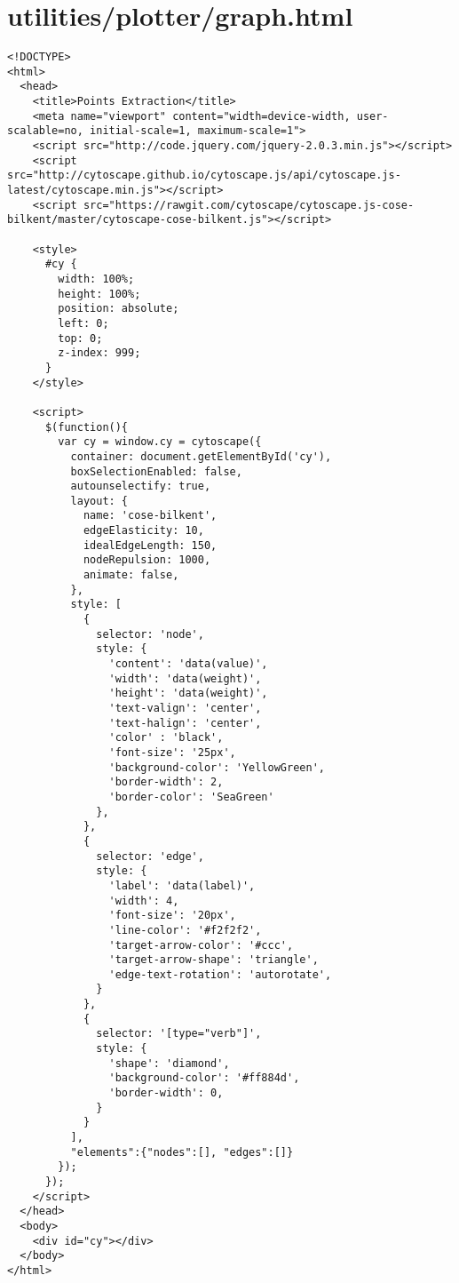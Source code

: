\documentclass{article}
\begin{document}
\section*{utilities/plotter/graph.html}
\begin{verbatim}
<!DOCTYPE>
<html>
  <head>
    <title>Points Extraction</title>
    <meta name="viewport" content="width=device-width, user-scalable=no, initial-scale=1, maximum-scale=1">
    <script src="http://code.jquery.com/jquery-2.0.3.min.js"></script>
    <script src="http://cytoscape.github.io/cytoscape.js/api/cytoscape.js-latest/cytoscape.min.js"></script>
    <script src="https://rawgit.com/cytoscape/cytoscape.js-cose-bilkent/master/cytoscape-cose-bilkent.js"></script>

    <style>
      #cy {
        width: 100%;
        height: 100%;
        position: absolute;
        left: 0;
        top: 0;
        z-index: 999;
      }
    </style>

    <script>
      $(function(){
        var cy = window.cy = cytoscape({
          container: document.getElementById('cy'),
          boxSelectionEnabled: false,
          autounselectify: true,
          layout: {
            name: 'cose-bilkent',
            edgeElasticity: 10,
            idealEdgeLength: 150,
            nodeRepulsion: 1000,
            animate: false,
          },
          style: [
            {
              selector: 'node',
              style: {
                'content': 'data(value)',
                'width': 'data(weight)',
                'height': 'data(weight)',
                'text-valign': 'center',
                'text-halign': 'center',
                'color' : 'black',
                'font-size': '25px',
                'background-color': 'YellowGreen',
                'border-width': 2,
                'border-color': 'SeaGreen'
              },
            },
            {
              selector: 'edge',
              style: {
                'label': 'data(label)',
                'width': 4,
                'font-size': '20px',
                'line-color': '#f2f2f2',
                'target-arrow-color': '#ccc',
                'target-arrow-shape': 'triangle',
                'edge-text-rotation': 'autorotate',
              }
            },
            {
              selector: '[type="verb"]',
              style: {
                'shape': 'diamond',
                'background-color': '#ff884d',
                'border-width': 0,
              }
            }
          ],
          "elements":{"nodes":[], "edges":[]}
        });
      });
    </script>
  </head>
  <body>
    <div id="cy"></div>
  </body>
</html>


\end{verbatim}
\pagebreak
\end{document}
